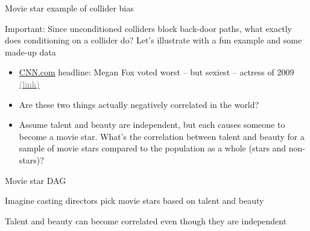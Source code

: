 \documentclass{beamer}
\newcommand{\myurlshort}[2]{\href{#1}{\textcolor{gray}{\textsf{#2}}}}
\begin{document}
\begin{frame}
\begin{itemize}
\begin{itemize}
          \end{itemize}
  \end{itemize}
  \framebreak


\end{frame}


\begin{frame}{Movie star example of collider bias}

  \alert{Important}: Since unconditioned colliders block back-door paths, what exactly does conditioning on a collider do? Let's illustrate with a fun example and some made-up data\\
  \begin{itemize}
    \item \underline{CNN.com} headline: Megan Fox voted worst -- but sexiest -- actress of 2009 \myurlshort{http://marquee.blogs.cnn.com/2009/12/30/megan-fox-voted-worst-but-sexiest-actress-of-2009/}{(link)}
    \item Are these two things actually negatively correlated in the world?
    \item Assume talent and beauty are independent, but each causes someone to become a movie star.  What's the correlation between talent and beauty for a sample of movie stars compared to the population as a whole (stars and non-stars)?
  \end{itemize}

\end{frame}


\begin{frame}{Movie star DAG}

Imagine casting directors pick movie stars based on talent and beauty

  \begin{center}
  \end{center}

Talent and beauty can become correlated even though they are independent


\end{frame}
\end{document}
